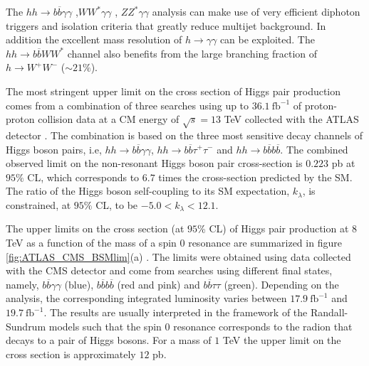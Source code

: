 The $hh\rightarrow b\overline{b}\gamma\gamma$ \cite{hhbbAA_CMS,hhAAbb_ATLAS},$WW^*\gamma\gamma$ \cite{hhATLAS,hhbbll_CMS}, $ZZ^*\gamma\gamma$ \cite{hhbbll_CMS} analysis can make use of very efficient diphoton triggers and isolation criteria that greatly reduce multijet background. In addition the excellent mass resolution of $h\rightarrow \gamma\gamma$ can be exploited. The $hh\rightarrow b\overline{b}WW^*$ channel also benefits from the large branching fraction of $h\rightarrow W^+W^-$ ($\sim 21 \%$).


The most stringent upper limit on the cross section of Higgs pair production comes from a combination of three searches using up to $36.1~\text{fb}^{-1}$ of proton-proton collision data at a CM energy of $\sqrt{s}=13$ TeV collected with the ATLAS detector \cite{ATLAShhComb}. The combination is based on the three most sensitive decay channels of Higgs boson pairs, i.e, $hh\rightarrow b\overline{b}\gamma\gamma$, $hh\rightarrow b\overline{b}\tau^+\tau^-$ and $hh\rightarrow b\overline{b}b\overline{b}$. The combined observed
limit on the non-resonant Higgs boson pair cross-section is $0.223$ pb at $95\%$ CL,
which corresponds to $6.7$ times the cross-section predicted by the SM. The ratio of the Higgs boson self-coupling to its SM expectation, $k_{\lambda}$, is constrained, at $95\%$ CL, to be $-5.0<k_{\lambda}<12.1$.

The upper limits on the cross section (at $95$\% CL) of Higgs pair production at $8$ TeV as a function of the mass of a spin 0 resonance are summarized in figure \ref{fig:ATLAS_CMS_BSMlim}(a) \cite{hhbbAA_CMS}. The limits were obtained using data collected with the CMS detector and come from searches using different final states, namely, $b\overline{b}\gamma\gamma$ (blue), $b\overline{b}b\overline{b}$ (red and pink) and $b\overline{b}\tau\tau$ (green). Depending on the analysis, the corresponding integrated luminosity varies between $17.9~\text{fb}^{-1}$ and $19.7~\text{fb}^{-1}$. The results are usually interpreted in the framework of the Randall-Sundrum models such that the spin 0 resonance corresponds to the radion that decays to a pair of Higgs bosons. For a mass of $1$ TeV the upper limit on the cross section is approximately $12$ pb.


